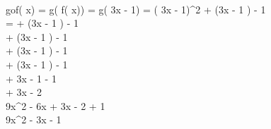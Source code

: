  \\

gof\left( x\right) = g\left( f\left( x\right)\right) = g\left( 3x - 1\right) = \left( 3x - 1\right)^{2} + \left(3x - 1 \right) - 1 \\

=  + \left(3x - 1 \right) - 1 \\

 + \left(3x - 1 \right) - 1 \\

\left[ 9x^{2} - 3x - 3x + 1 \right] + \left(3x - 1 \right) - 1 \\

\left[ 9x^{2} - 6x + 1\right] + \left(3x - 1 \right) - 1 \\

\left[ 9x^{2} - 6x + 1\right] + 3x - 1 - 1 \\

\left[ 9x^{2} - 6x + 1\right] + 3x - 2 \\

9x^{2} - 6x + 3x - 2 + 1 \\

9x^{2} - 3x - 1 \\
